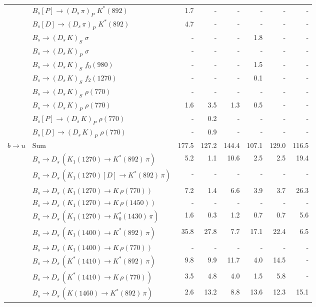 \begin{tabular}{l l  r  r  r  r  r  r  }
 & $B_s[P] \to ( D_s \, \pi)_{P} \, \, K^{*}(892)$ & 1.7 & -  & -  & -  & -  & -  \\ 
 & $B_s[D] \to ( D_s \, \pi)_{P} \, \, K^{*}(892)$ & 4.7 & -  & -  & -  & -  & -  \\ 
 & $B_s \to ( D_s \, K)_{S} \, \, \sigma$ & -  & -  & -  & 1.8 & -  & -  \\ 
 & $B_s \to ( D_s \, K)_{P} \, \, \sigma$ & -  & -  & -  & -  & -  & -  \\ 
 & $B_s \to ( D_s \, K)_{S} \, \, f_0(980)$ & -  & -  & -  & 1.5 & -  & -  \\ 
 & $B_s \to ( D_s \, K)_{S} \, \, f_2(1270)$ & -  & -  & -  & 0.1 & -  & -  \\ 
 & $B_s \to ( D_s \, K)_{S} \, \, \rho(770)$ & -  & -  & -  & -  & -  & -  \\ 
 & $B_s \to ( D_s \, K)_{P} \, \, \rho(770)$ & 1.6 & 3.5 & 1.3 & 0.5 & -  & -  \\ 
 & $B_s[P] \to ( D_s \, K)_{P} \, \, \rho(770)$ & -  & 0.2 & -  & -  & -  & -  \\ 
 & $B_s[D] \to ( D_s \, K)_{P} \, \, \rho(770)$ & -  & 0.9 & -  & -  & -  & -  \\ 
\multirow{28}{*}{$b \to u$}  & $\text{Sum}$ & 177.5 & 127.2 & 144.4 & 107.1 & 129.0 & 116.5 \\ 
\hline
 & $B_s \to D_s \, ( K_1(1270) \to K^{*}(892) \, \pi )$ & 5.2 & 1.1 & 10.6 & 2.5 & 2.5 & 19.4 \\ 
 & $B_s \to D_s \, ( K_1(1270)[D] \to K^{*}(892) \, \pi )$ & -  & -  & -  & -  & -  & -  \\ 
 & $B_s \to D_s \, ( K_1(1270) \to K \, \rho(770) )$ & 7.2 & 1.4 & 6.6 & 3.9 & 3.7 & 26.3 \\ 
 & $B_s \to D_s \, ( K_1(1270) \to K \, \rho(1450) )$ & -  & -  & -  & -  & -  & -  \\ 
 & $B_s \to D_s \, ( K_1(1270) \to K^{*}_{0}(1430) \, \pi )$ & 1.6 & 0.3 & 1.2 & 0.7 & 0.7 & 5.6 \\ 
 & $B_s \to D_s \, ( K_1(1400) \to K^{*}(892) \, \pi )$ & 35.8 & 27.8 & 7.7 & 17.1 & 22.4 & 6.5 \\ 
 & $B_s \to D_s \, ( K_1(1400) \to K \, \rho(770) )$ & -  & -  & -  & -  & -  & -  \\ 
 & $B_s \to D_s \, ( K^{*}(1410) \to K^{*}(892) \, \pi )$ & 9.8 & 9.9 & 11.7 & 4.0 & 14.5 & -  \\ 
 & $B_s \to D_s \, ( K^{*}(1410) \to K \, \rho(770) )$ & 3.5 & 4.8 & 4.0 & 1.5 & 5.8 & -  \\ 
 & $B_s \to D_s \, ( K(1460) \to K^{*}(892) \, \pi )$ & 2.6 & 13.2 & 8.8 & 13.6 & 12.3 & 15.1 \\ 

\end{tabular}
